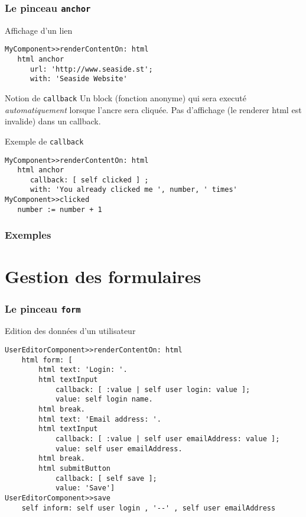 \documentclass[9pt,compress]{beamer}
\newcommand{\code}[1]{\texttt{\textup{\NoAutoSpaceBeforeFDP #1\AutoSpaceBeforeFDP}}} %
\begin{document}
\begin{frame}[containsverbatim]\frametitle{Le pinceau \texttt{anchor}}
	
	\begin{block}{Affichage d'un lien}
\begin{verbatim}
MyComponent>>renderContentOn: html
   html anchor
      url: 'http://www.seaside.st';
      with: 'Seaside Website'
\end{verbatim}
	\end{block}

\begin{block}{Notion de \texttt{callback}}
	Un block (fonction anonyme) qui sera executé \emph{automatiquement} lorsque l'ancre sera cliquée.
\alert{Pas d'affichage} (le renderer html est invalide) dans un callback.
\end{block}
	
\begin{block}{Exemple de \texttt{callback}}
\begin{verbatim}
MyComponent>>renderContentOn: html	
   html anchor
      callback: [ self clicked ] ;
      with: 'You already clicked me ', number, ' times'
MyComponent>>clicked
   number := number + 1
\end{verbatim}	
\end{block}

\end{frame}

\begin{frame}\frametitle{Exemples}
	\vfill
	\centering {\huge\color{mystructurecolor}Démo \code{WAMultiCounter}}
	\vfill
\end{frame}

\section{Gestion des formulaires} %

\begin{frame}[containsverbatim]\frametitle{Le pinceau \texttt{form}}
	
	\begin{block}{Edition des données d'un utilisateur}
\begin{verbatim}
UserEditorComponent>>renderContentOn: html
    html form: [
        html text: 'Login: '.
        html textInput
            callback: [ :value | self user login: value ];
            value: self login name.
        html break.
        html text: 'Email address: '.
        html textInput
            callback: [ :value | self user emailAddress: value ];
            value: self user emailAddress.
        html break.
        html submitButton
            callback: [ self save ];
            value: 'Save']
UserEditorComponent>>save
	self inform: self user login , '--' , self user emailAddress
\end{verbatim}
\end{block}
\end{frame}
\end{document}
